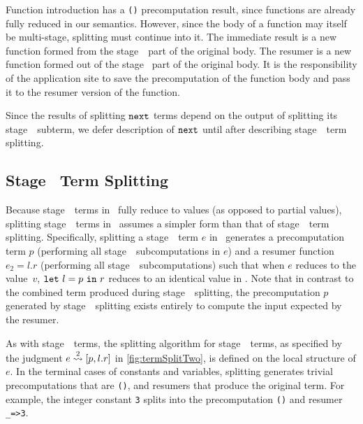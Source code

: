 Function introduction has a \texttt{()} precomputation result,
since functions are already fully reduced in our semantics.
However, since the body of a function may itself be multi-stage, splitting must continue into it.
The immediate result is a new function formed from the stage~\bbone\ part of the original body.
The resumer is a new function formed out of the stage \bbtwo\ part of the original body.
It is the responsibility of the application site to save the precomputation of the function body
and pass it to the resumer version of the function.

Since the results of splitting ${\tt next}$ terms depend on the output of splitting its stage~\bbtwo\ subterm,
we defer description of ${\tt next}$ until after describing stage~\bbtwo\ term splitting. %

\subsection{Stage \bbtwo\ Term Splitting}

Because stage~\bbtwo\ terms in \lang\ fully reduce to values (as opposed to partial values),
splitting stage~\bbtwo\ terms in \lang\ assumes a simpler form than that of stage~\bbone\ term splitting. 
Specifically, splitting a stage~\bbtwo\ term $e$ in \lang\ generates a precomputation term $p$
(performing all stage~\bbone\ subcomputations in $e$) and a
resumer function $e_2=l.r$ (performing all stage~\bbtwo\ subcomputations) such that when 
$e$ reduces to the value~$v$, ${\tt let}~{l} = {p}~{\tt in}~{r}$ reduces to an identical value in \langmono.
Note that in contrast to the combined term produced during stage~\bbone\ splitting,
the precomputation $p$ generated by stage~\bbtwo\ splitting exists entirely
to compute the input expected by the resumer.


As with stage~\bbone\ terms, the splitting algorithm for stage~\bbtwo\ terms,
as specified by the judgment $e \overset{ 2}\rightsquigarrow [p,l.r]$ in \cref{fig:termSplitTwo}, is defined on the local structure of $e$.
In the terminal cases of
constants and variables, splitting generates trivial precomputations that are \texttt{()}, and resumers that produce the original term. For
example, the integer constant \texttt{3} splits into the
precomputation \texttt{()} and resumer \texttt{\_=>3}.

